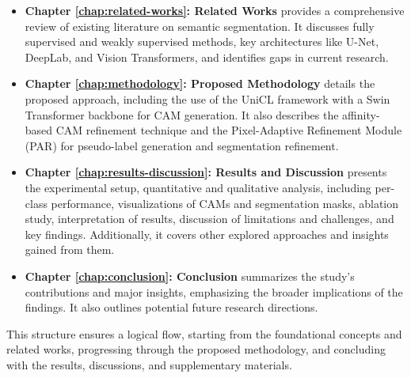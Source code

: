 \begin{itemize}
    \item \textbf{Chapter \ref{chap:related-works}: Related Works} provides a comprehensive review of existing literature on semantic segmentation. It discusses fully supervised and weakly supervised methods, key architectures like U-Net, DeepLab, and Vision Transformers, and identifies gaps in current research.

    \item \textbf{Chapter \ref{chap:methodology}: Proposed Methodology} details the proposed approach, including the use of the UniCL framework with a Swin Transformer backbone for CAM generation. It also describes the affinity-based CAM refinement technique and the Pixel-Adaptive Refinement Module (PAR) for pseudo-label generation and segmentation refinement.
    \item \textbf{Chapter \ref{chap:results-discussion}: Results and Discussion} presents the experimental setup, quantitative and qualitative analysis, including per-class performance, visualizations of CAMs and segmentation masks, ablation study, interpretation of results, discussion of limitations and challenges, and key findings. Additionally, it covers other explored approaches and insights gained from them.

    \item \textbf{Chapter \ref{chap:conclusion}: Conclusion} summarizes the study’s contributions and major insights, emphasizing the broader implications of the findings. It also outlines potential future research directions.
\end{itemize}

This structure ensures a logical flow, starting from the foundational concepts and related works, progressing through the proposed methodology, and concluding with the results, discussions, and supplementary materials.

